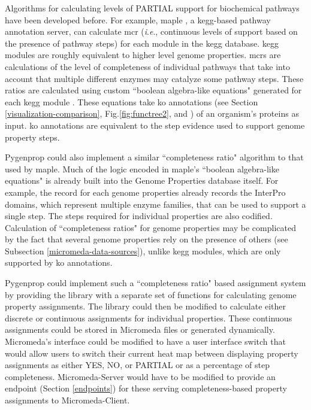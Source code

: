 Algorithms for calculating levels of PARTIAL support for biochemical pathways 
have been developed before. For example, \gls{maple} \cite{takami2016automated}, 
a \gls{kegg}-based pathway annotation server, can calculate \gls{mcr} 
(\textit{i}.\textit{e}., continuous levels of support based on the presence of 
pathway steps) for each module in the \gls{kegg}  database. \gls{kegg} modules 
are roughly equivalent to higher level genome properties. \gls{mcr}s are 
calculations of the level of completeness of individual pathways that take into 
account that multiple different enzymes may catalyze some pathway steps. These 
ratios are calculated using custom ``boolean algebra-like equations" generated 
for each \gls{kegg} module \cite{takami2012evaluation}. These equations take 
\gls{ko} annotations (see Section \ref{visualization-comparison}, 
Fig.\ref{fig:functree2}, and \cite{mao2005automated}) of an organism's proteins 
as input. \gls{ko} annotations are equivalent to the step evidence used to 
support genome property steps. 

Pygenprop could also implement a similar ``completeness ratio" algorithm to that 
used by \gls{maple}. Much of the logic encoded in \gls{maple}'s ``boolean 
algebra-like equations" is already built into the Genome Properties database 
itself. For example, the record for each genome properties already records the 
InterPro domains, which represent multiple enzyme families, that can be used to 
support a single step. The steps required for individual properties are also 
codified. Calculation of ``completeness ratios" for genome properties may be 
complicated by the fact that several genome properties rely on the presence of 
others (see Subsection \ref{micromeda-data-sources}), unlike \gls{kegg} 
modules, which are only supported by \gls{ko} annotations.

Pygenprop could implement such a ``completeness ratio" based assignment system 
by providing the library with a separate set of functions for calculating genome property 
assignments. The library could then be modified to calculate either discrete or 
continuous assignments for individual properties. These continuous assignments 
could be stored in Micromeda files or generated dynamically. Micromeda's 
interface could be modified to have a user interface switch that would allow 
users to switch their current heat map between displaying property assignments 
as either YES, NO, or PARTIAL or as a percentage of step completeness. 
Micromeda-Server would have to be modified to provide an endpoint (Section 
\ref{endpoints}) for these serving completeness-based property assignments to 
Micromeda-Client.

